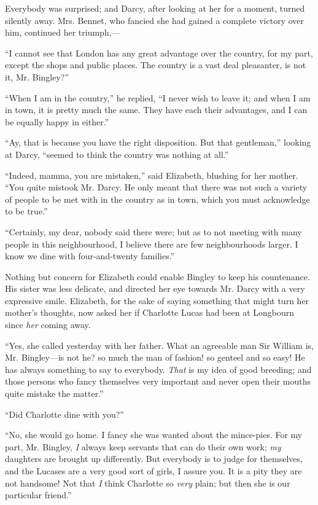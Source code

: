 \documentclass[12pt]{book}
\begin{document}
Everybody was surprised; and Darcy, after looking at her for a moment, turned silently away. Mrs. Bennet, who fancied she had gained a complete victory over him, continued her triumph,---

``I cannot see that London has any great advantage over the country, for my part, except the shops and public places. The country is a vast deal pleasanter, is not it, Mr. Bingley?''

``When I am in the country,'' he replied, ``I never wish to leave it; and when I am in town, it is pretty much the same. They have each their advantages, and I can be equally happy in either.''

``Ay, that is because you have the right disposition. But that gentleman,'' looking at Darcy, ``seemed to think the country was nothing at all.''

``Indeed, mamma, you are mistaken,'' said Elizabeth, blushing for her mother. ``You quite mistook Mr. Darcy. He only meant that there was not such a variety of people to be met with in the country as in town, which you must acknowledge to be true.''

``Certainly, my dear, nobody said there were; but as to not meeting with many people in this neighbourhood, I believe there are few neighbourhoods larger. I know we dine with four-and-twenty families.''

Nothing but concern for Elizabeth could enable Bingley to keep his countenance. His sister was less delicate, and directed her eye towards Mr. Darcy with a very expressive smile. Elizabeth, for the sake of saying something that might turn her mother's thoughts, now asked her if Charlotte Lucas had been at Longbourn since \textit{her} coming away.

``Yes, she called yesterday with her father. What an agreeable man Sir William is, Mr. Bingley---is not he? so much the man of fashion! so genteel and so easy! He has always something to say to everybody. \textit{That} is my idea of good breeding; and those persons who fancy themselves very important and never open their mouths quite mistake the matter.''

``Did Charlotte dine with you?''

``No, she would go home. I fancy she was wanted about the mince-pies. For my part, Mr. Bingley, \textit{I} always keep servants that can do their own work; \textit{my} daughters are brought up differently. But everybody is to judge for themselves, and the Lucases are a very good sort of girls, I assure you. It is a pity they are not handsome! Not that \textit{I} think Charlotte so \textit{very} plain; but then she is our particular friend.''
\end{document}
